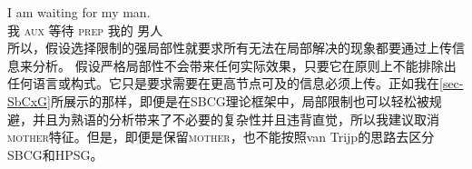 \ea
\gll I am waiting for my man.\\
    我 \textsc{aux} 等待 \textsc{prep} 我的 男人\\
\z 
所以，假设选择限制的强局部性就要求所有无法在局部解决的现象都要通过上传信息来分析。
假设严格局部性不会带来任何实际效果，只要它在原则上不能排除出任何语言或构式。它只是要求需要在更高节点可及的信息必须上传。正如我在\ref{sec-SbCxG}所展示的那样，即便是在SBCG理论框架中，局部限制也可以轻松被规避，并且为熟语的分析带来了不必要的复杂性并且违背直觉，所以我建议取消\textsc{mother}特征。但是，即便是保留\textsc{mother}，也不能按照van Trijp的思路去区分SBCG和HPSG。

